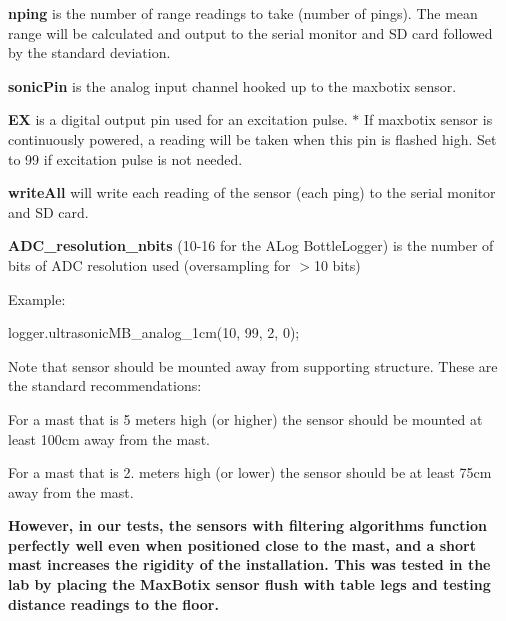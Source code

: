 {\bfseries nping} is the number of range readings to take (number of pings). The mean range will be calculated and output to the serial monitor and SD card followed by the standard deviation.

{\bfseries sonic\+Pin} is the analog input channel hooked up to the maxbotix sensor.

{\bfseries EX} is a digital output pin used for an excitation pulse. $\ast$ If maxbotix sensor is continuously powered, a reading will be taken when this pin is flashed high. Set to \textquotesingle{}99\textquotesingle{} if excitation pulse is not needed.

{\bfseries write\+All} will write each reading of the sensor (each ping) to the serial monitor and SD card.

{\bfseries A\+D\+C\+\_\+resolution\+\_\+nbits} (10-\/16 for the A\+Log Bottle\+Logger) is the number of bits of A\+DC resolution used (oversampling for $>$10 bits)

Example\+: 
\begin{DoxyCode}
logger.ultrasonicMB\_analog\_1cm(10, 99, 2, 0);
\end{DoxyCode}
 Note that sensor should be mounted away from supporting structure. These are the standard recommendations\+:
\begin{DoxyItemize}
\item For a mast that is 5 meters high (or higher) the sensor should be mounted at least 100cm away from the mast.
\item For a mast that is 2. meters high (or lower) the sensor should be at least 75cm away from the mast.
\end{DoxyItemize}

{\bfseries However, in our tests, the sensors with filtering algorithms function perfectly well even when positioned close to the mast, and a short mast increases the rigidity of the installation. This was tested in the lab by placing the Max\+Botix sensor flush with table legs and testing distance readings to the floor.}

